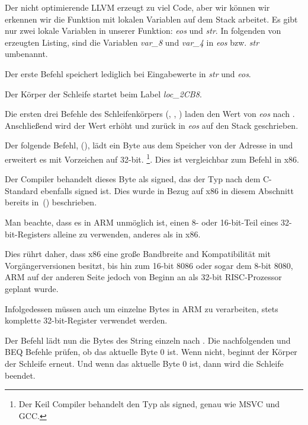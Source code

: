 
\mysubparagraph{\NonOptimizingXcodeIV (\ARMMode)}



Der nicht optimierende LLVM erzeugt zu viel Code, aber wir können wir erkennen
wir die Funktion mit lokalen Variablen auf dem Stack arbeitet. 
Es gibt nur zwei lokale Variablen in unserer Funktion: \emph{eos} und \emph{str}.
In folgenden von \IDA erzeugten Listing, sind die Variablen \emph{var\_8} und
\emph{var\_4} in \emph{eos} bzw. \emph{str} umbenannt.

Der erste Befehl speichert lediglich bei Eingabewerte in \emph{str} und \emph{eos}.

Der Körper der Schleife startet beim Label \emph{loc\_2CB8}.

Die ersten drei Befehle des Schleifenkörpers (, \ADD, ) laden
den Wert von \emph{eos} nach . 
Anschließend wird der Wert erhöht und zurück in \emph{eos} auf den Stack
geschrieben.

Der folgende Befehl,  (), lädt
ein Byte aus dem Speicher von der Adresse in  und erweitert es mit
Vorzeichen auf 32-bit.
\footnote{Der Keil Compiler behandelt den Typ \Tchar als signed, genau wie
MSVC und GCC.}.
Dies ist vergleichbar zum \MOVSX Befehl in x86.

Der Compiler behandelt dieses Byte als signed, das der \Tchar Typ nach dem
C-Standard ebenfalls signed ist. 
Dies wurde in Bezug auf x86 in diesem Abschnitt bereits in~()
beschrieben.


Man beachte, dass es in ARM unmöglich ist, einen 8- oder 16-bit-Teil eines
32-bit-Registers alleine zu verwenden, anderes als in x86.

Dies rührt daher, dass x86 eine große Bandbreite and Kompatibilität mit
Vorgängerversionen besitzt, bis hin zum 16-bit 8086 oder sogar dem 8-bit 8080,
ARM auf der anderen Seite jedoch von Beginn an als 32-bit RISC-Prozessor geplant
wurde.

Infolgedessen müssen auch um einzelne Bytes in ARM zu verarbeiten, stets
komplette 32-bit-Register verwendet werden.

Der Befehl  lädt nun die Bytes des String einzeln nach .
Die nachfolgenden \CMP und \ac{BEQ} Befehle prüfen, ob das aktuelle Byte 0 ist.
Wenn nicht, beginnt der Körper der Schleife erneut.
Und wenn das aktuelle Byte 0 ist, dann wird die Schleife beendet.

